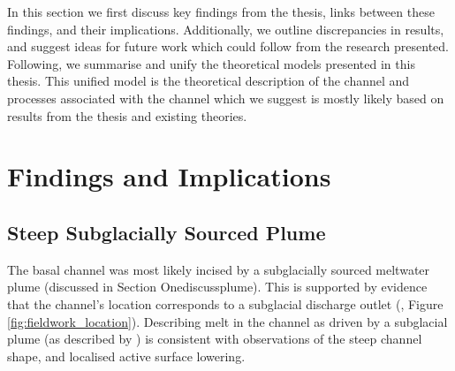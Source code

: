 







In this section we first discuss key findings from the thesis, links between these findings, and their implications. Additionally, we outline discrepancies in results, and suggest ideas for future work which could follow from the research presented.
Following,  we summarise and unify the theoretical models presented in this thesis. This unified model is the theoretical description of the channel and processes associated with the channel which we suggest is mostly likely based on results from the thesis and existing theories.


\section{Findings and Implications} \label{sec:findings}


\subsection{Steep Subglacially Sourced Plume}

The basal channel was most likely incised by a subglacially sourced meltwater plume (discussed in Section Onediscussplume). This is supported by evidence that the channel's location corresponds to a  subglacial discharge outlet (\cite{alley2016impacts,le2009subglacial}, Figure \ref{fig:fieldwork_location}).
Describing melt in the channel as driven by a subglacial plume (as described by \cite{jenkins1991one}) is consistent with observations of the steep channel shape, and localised active surface lowering.

